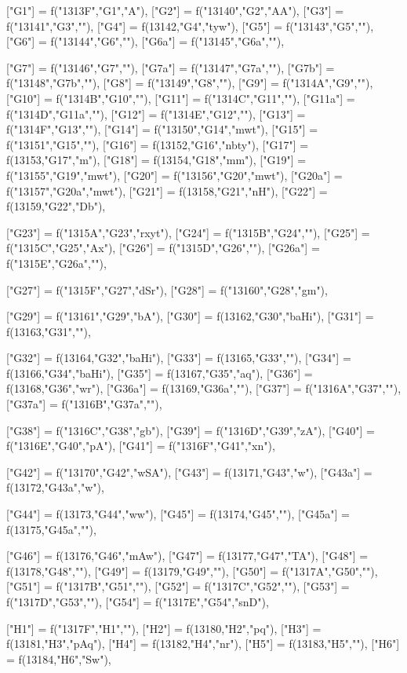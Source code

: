 \documentclass{article}
\begin{document}
\begin{luacode*}
{	["G1"] = f("1313F","G1","A"),
	["G2"] = f("13140","G2","AA"),
	["G3"] = f("13141","G3",""),
	["G4"] = f(13142,"G4","tyw"),
	["G5"] = f("13143","G5",""),
	["G6"] = f("13144","G6",""),
	["G6a"] = f("13145","G6a",""),

	["G7"] = f("13146","G7",""),
	["G7a"] = f("13147","G7a",""),
	["G7b"] = f("13148","G7b",""),
	["G8"] = f("13149","G8",""),
	["G9"] = f("1314A","G9",""),
	["G10"] = f("1314B","G10",""),
	["G11"] = f("1314C","G11",""),
	["G11a"] = f("1314D","G11a",""),
	["G12"] = f("1314E","G12",""),
	["G13"] = f("1314F","G13",""),
	["G14"] = f("13150","G14","mwt"),
	["G15"] = f("13151","G15",""),
	["G16"] = f(13152,"G16","nbty"),
	["G17"] = f(13153,"G17","m"),
	["G18"] = f(13154,"G18","mm"),
	["G19"] = f("13155","G19","mwt"),
	["G20"] = f("13156","G20","mwt"),
	["G20a"] = f("13157","G20a","mwt"),
	["G21"] = f(13158,"G21","nH"),
	["G22"] = f(13159,"G22","Db"),

	["G23"] = f("1315A","G23","rxyt"),
	["G24"] = f("1315B","G24",""),
	["G25"] = f("1315C","G25","Ax"),
	["G26"] = f("1315D","G26",""),
	["G26a"] = f("1315E","G26a",""),


	["G27"] = f("1315F","G27","dSr"),	
	["G28"] = f("13160","G28","gm"),

	["G29"] = f("13161","G29","bA"),
	["G30"] = f(13162,"G30","baHi"),
	["G31"] = f(13163,"G31",""),

	["G32"] = f(13164,"G32","baHi"),
	["G33"] = f(13165,"G33",""),
	["G34"] = f(13166,"G34","baHi"),
	["G35"] = f(13167,"G35","aq"),
	["G36"] = f(13168,"G36","wr"),
	["G36a"] = f(13169,"G36a",""),
	["G37"] = f("1316A","G37",""),
	["G37a"] = f("1316B","G37a",""),

	["G38"] = f("1316C","G38","gb"),
	["G39"] = f("1316D","G39","zA"),
	["G40"] = f("1316E","G40","pA"),
	["G41"] = f("1316F","G41","xn"),

	["G42"] = f("13170","G42","wSA"),
	["G43"] = f(13171,"G43","w"),
	["G43a"] = f(13172,"G43a","w"),


	["G44"] = f(13173,"G44","ww"),
	["G45"] = f(13174,"G45",""),
	["G45a"] = f(13175,"G45a",""),


	["G46"] = f(13176,"G46","mAw"),
	["G47"] = f(13177,"G47","TA"),
	["G48"] = f(13178,"G48",""),
	["G49"] = f(13179,"G49",""),
	["G50"] = f("1317A","G50",""),
	["G51"] = f("1317B","G51",""),
	["G52"] = f("1317C","G52",""),
	["G53"] = f("1317D","G53",""),
	["G54"] = f("1317E","G54","snD"),


	["H1"] = f("1317F","H1",""),
	["H2"] = f(13180,"H2","pq"),
	["H3"] = f(13181,"H3","pAq"),
	["H4"] = f(13182,"H4","nr"),
	["H5"] = f(13183,"H5",""),
	["H6"] = f(13184,"H6","Sw"),


}
\end{luacode*}
\end{document}
